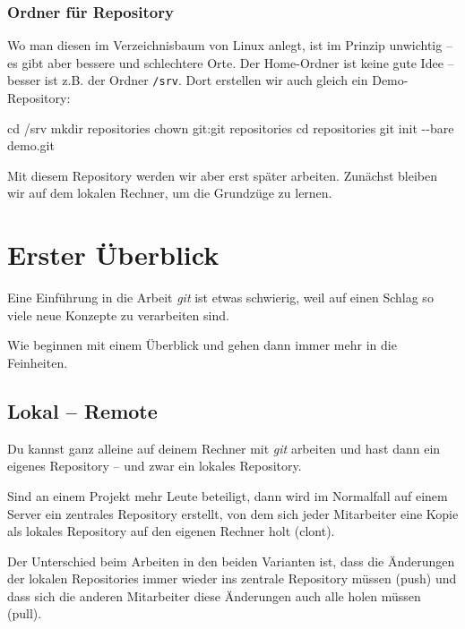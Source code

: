 \documentclass[
  letterpaper,
  DIV=11]{scrreprt}
\newenvironment{Shaded}{\begin{snugshade}}{\end{snugshade}}
\newcommand{\AttributeTok}[1]{\textcolor[rgb]{0.40,0.45,0.13}{#1}}
\newcommand{\BuiltInTok}[1]{\textcolor[rgb]{0.00,0.23,0.31}{#1}}
\newcommand{\FunctionTok}[1]{\textcolor[rgb]{0.28,0.35,0.67}{#1}}
\newcommand{\NormalTok}[1]{\textcolor[rgb]{0.00,0.23,0.31}{#1}}
\newcommand{\git}{\textit{git}\xspace}
\begin{document}
\subsection{Ordner für Repository}\label{ordner-fuxfcr-repository}

Wo man diesen im Verzeichnisbaum von Linux anlegt, ist im Prinzip
unwichtig -- es gibt aber bessere und schlechtere Orte. Der Home-Ordner
ist keine gute Idee -- besser ist z.B. der Ordner \texttt{/srv}. Dort
erstellen wir auch gleich ein Demo-Repository:

\begin{Shaded}
\begin{Highlighting}[]
\BuiltInTok{cd}\NormalTok{ /srv }
\FunctionTok{mkdir}\NormalTok{ repositories}
\FunctionTok{chown}\NormalTok{ git:git repositories }
\BuiltInTok{cd}\NormalTok{ repositories}
\FunctionTok{git}\NormalTok{ init }\AttributeTok{{-}{-}bare}\NormalTok{ demo.git}
\end{Highlighting}
\end{Shaded}

Mit diesem Repository werden wir aber erst später arbeiten. Zunächst
bleiben wir auf dem lokalen Rechner, um die Grundzüge zu lernen.


\chapter{Erster Überblick}\label{erster-uxfcberblick}

Eine Einführung in die Arbeit \git ist etwas schwierig, weil auf einen
Schlag so viele neue Konzepte zu verarbeiten sind.

Wie beginnen mit einem Überblick und gehen dann immer mehr in die
Feinheiten.

\section{Lokal -- Remote}\label{lokal-remote}

Du kannst ganz alleine auf deinem Rechner mit \git arbeiten und hast
dann ein eigenes Repository -- und zwar ein lokales Repository.

Sind an einem Projekt mehr Leute beteiligt, dann wird im Normalfall auf
einem Server ein zentrales Repository erstellt, von dem sich jeder
Mitarbeiter eine Kopie als lokales Repository auf den eigenen Rechner
holt (clont).

Der Unterschied beim Arbeiten in den beiden Varianten ist, dass die
Änderungen der lokalen Repositories immer wieder ins zentrale Repository
müssen (push) und\\
dass sich die anderen Mitarbeiter diese Änderungen auch alle holen
müssen (pull).
\end{document}
